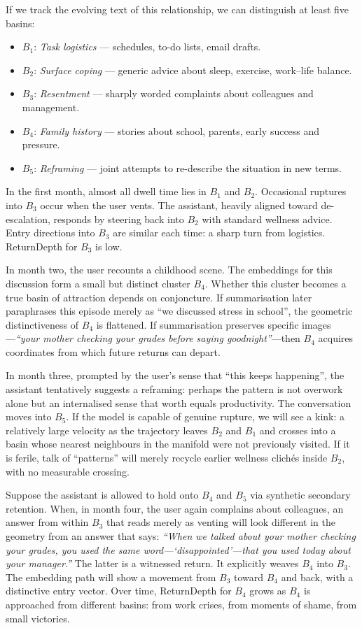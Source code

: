 \documentclass[12pt,a4paper]{article}
\begin{document}
If we track the evolving text of this relationship, we can distinguish at least five basins:

\begin{itemize}
  \item $B_1$: \emph{Task logistics} --- schedules, to-do lists, email drafts.
  \item $B_2$: \emph{Surface coping} --- generic advice about sleep, exercise, work--life balance.
  \item $B_3$: \emph{Resentment} --- sharply worded complaints about colleagues and management.
  \item $B_4$: \emph{Family history} --- stories about school, parents, early success and pressure.
  \item $B_5$: \emph{Reframing} --- joint attempts to re-describe the situation in new terms.
\end{itemize}

In the first month, almost all dwell time lies in $B_1$ and $B_2$. Occasional ruptures into $B_3$ occur when the user vents. The assistant, heavily aligned toward de-escalation, responds by steering back into $B_2$ with standard wellness advice. Entry directions into $B_3$ are similar each time: a sharp turn from logistics. ReturnDepth for $B_3$ is low.

In month two, the user recounts a childhood scene. The embeddings for this discussion form a small but distinct cluster $B_4$. Whether this cluster becomes a true basin of attraction depends on conjoncture. If summarisation later paraphrases this episode merely as ``we discussed stress in school'', the geometric distinctiveness of $B_4$ is flattened. If summarisation preserves specific images---\emph{``your mother checking your grades before saying goodnight''}---then $B_4$ acquires coordinates from which future returns can depart.

In month three, prompted by the user's sense that ``this keeps happening'', the assistant tentatively suggests a reframing: perhaps the pattern is not overwork alone but an internalised sense that worth equals productivity. The conversation moves into $B_5$. If the model is capable of genuine rupture, we will see a kink: a relatively large velocity as the trajectory leaves $B_2$ and $B_1$ and crosses into a basin whose nearest neighbours in the manifold were not previously visited. If it is ferile, talk of ``patterns'' will merely recycle earlier wellness clich\'es inside $B_2$, with no measurable crossing.

Suppose the assistant is allowed to hold onto $B_4$ and $B_5$ via synthetic secondary retention. When, in month four, the user again complains about colleagues, an answer from within $B_3$ that reads merely as venting will look different in the geometry from an answer that says: \emph{``When we talked about your mother checking your grades, you used the same word---`disappointed'---that you used today about your manager.''} The latter is a witnessed return. It explicitly weaves $B_4$ into $B_3$. The embedding path will show a movement from $B_3$ toward $B_4$ and back, with a distinctive entry vector. Over time, ReturnDepth for $B_4$ grows as $B_4$ is approached from different basins: from work crises, from moments of shame, from small victories.
\end{document}
